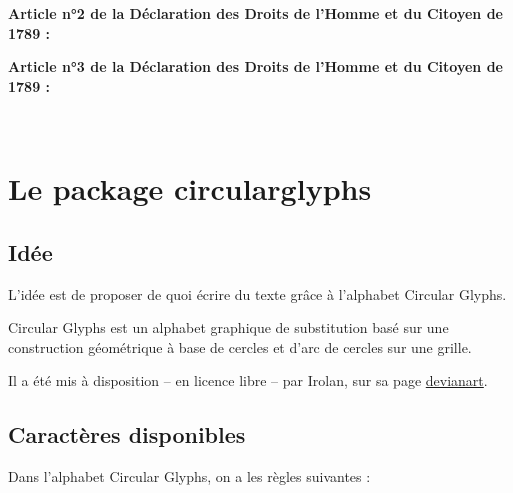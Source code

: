 \documentclass[french,11pt,a4paper]{article}
\begin{document}
\medskip


\bigskip

\textbf{Article n°2 de la Déclaration des Droits de l'Homme et du Citoyen de 1789 : }

\medskip

{\LARGE{}}

\bigskip

\textbf{Article n°3 de la Déclaration des Droits de l'Homme et du Citoyen de 1789 : }

\medskip

\textcolor{purple}{\large{}}

\vfill~

\pagebreak

\section{Le package circularglyphs}

\subsection{Idée}

L'idée est de proposer de quoi écrire du texte grâce à l'alphabet \textsf{Circular Glyphs}.

\smallskip

\textsf{Circular Glyphs} est un alphabet graphique de substitution basé sur une construction géométrique à base de cercles et d'arc de cercles sur une grille.

Il a été mis à disposition -- en licence libre -- par \textsf{Irolan}, sur sa page \href{https://www.deviantart.com/irolan/art/Circular-Glyphs-479352599}{devianart}.

\subsection{Caractères disponibles}

Dans l'alphabet \textsf{Circular Glyphs}, on a les règles suivantes :
\end{document}
